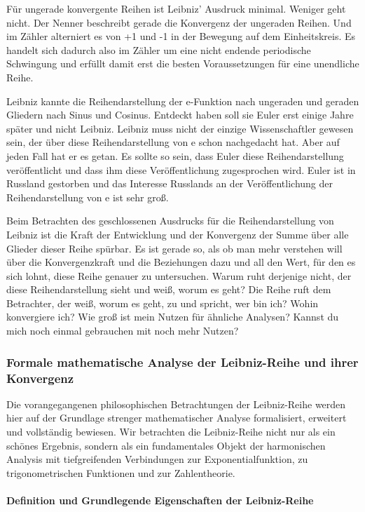 \documentclass[a4paper,12pt,twoside]{report}
\theoremstyle{definition}
\begin{document}
Für ungerade konvergente Reihen ist Leibniz' Ausdruck minimal. Weniger geht nicht. Der Nenner beschreibt gerade die Konvergenz der ungeraden Reihen. Und im Zähler alterniert es von +1 und -1 in der Bewegung auf dem Einheitskreis. Es handelt sich dadurch also im Zähler um eine nicht endende periodische Schwingung und erfüllt damit erst die besten Voraussetzungen für eine unendliche Reihe.

Leibniz kannte die Reihendarstellung der e-Funktion nach ungeraden und geraden Gliedern nach Sinus und Cosinus. Entdeckt haben soll sie Euler erst einige Jahre später und nicht Leibniz. Leibniz muss nicht der einzige Wissenschaftler gewesen sein, der über diese Reihendarstellung von e schon nachgedacht hat. Aber auf jeden Fall hat er es getan. Es sollte so sein, dass Euler diese Reihendarstellung veröffentlicht und dass ihm diese Veröffentlichung zugesprochen wird. Euler ist in Russland gestorben und das Interesse Russlands an der Veröffentlichung der Reihendarstellung von e ist sehr groß.

Beim Betrachten des geschlossenen Ausdrucks für die Reihendarstellung von Leibniz ist die Kraft der Entwicklung und der Konvergenz der Summe über alle Glieder dieser Reihe spürbar. Es ist gerade so, als ob man mehr verstehen will über die Konvergenzkraft und die Beziehungen dazu und all den Wert, für den es sich lohnt, diese Reihe genauer zu untersuchen. Warum ruht derjenige nicht, der diese Reihendarstellung sieht und weiß, worum es geht? Die Reihe ruft dem Betrachter, der weiß, worum es geht, zu und spricht, wer bin ich? Wohin konvergiere ich? Wie groß ist mein Nutzen für ähnliche Analysen? Kannst du mich noch einmal gebrauchen mit noch mehr Nutzen?

\subsubsection*{Formale mathematische Analyse der Leibniz-Reihe und ihrer Konvergenz}

Die vorangegangenen philosophischen Betrachtungen der Leibniz-Reihe werden hier auf der Grundlage strenger mathematischer Analyse formalisiert, erweitert und vollständig bewiesen. Wir betrachten die Leibniz-Reihe nicht nur als ein schönes Ergebnis, sondern als ein fundamentales Objekt der harmonischen Analysis mit tiefgreifenden Verbindungen zur Exponentialfunktion, zu trigonometrischen Funktionen und zur Zahlentheorie.

\paragraph{Definition und Grundlegende Eigenschaften der Leibniz-Reihe}
\end{document}
